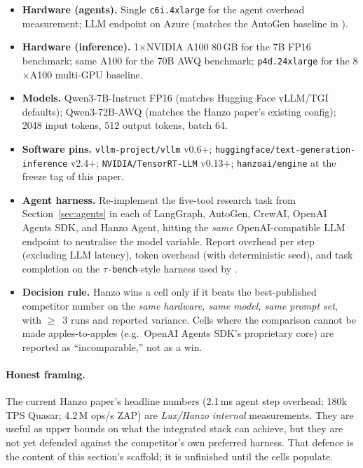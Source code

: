 \begin{itemize}
  \item \textbf{Hardware (agents).} Single \texttt{c6i.4xlarge} for the
        agent overhead measurement; LLM endpoint on Azure (matches the
        AutoGen baseline in \cite{pooya2026frameworks}).
  \item \textbf{Hardware (inference).} 1$\times$NVIDIA A100 80\,GB for
        the 7B FP16 benchmark; same A100 for the 70B AWQ benchmark;
        \texttt{p4d.24xlarge} for the 8$\times$A100 multi-GPU baseline.
  \item \textbf{Models.}
        Qwen3-7B-Instruct FP16 (matches Hugging Face vLLM/TGI defaults);
        Qwen3-72B-AWQ (matches the Hanzo paper's existing config);
        2048 input tokens, 512 output tokens, batch 64.
  \item \textbf{Software pins.}
        \texttt{vllm-project/vllm} v0.6+; \texttt{huggingface/text-generation-inference}
        v2.4+; \texttt{NVIDIA/TensorRT-LLM} v0.13+; \texttt{hanzoai/engine}
        at the freeze tag of this paper.
  \item \textbf{Agent harness.}
        Re-implement the five-tool research task from
        Section~\ref{sec:agents} in each of LangGraph, AutoGen, CrewAI,
        OpenAI Agents SDK, and Hanzo Agent, hitting the \emph{same}
        OpenAI-compatible LLM endpoint to neutralise the model variable.
        Report overhead per step (excluding LLM latency), token overhead
        (with deterministic seed), and task completion on the
        \texttt{$\tau$-bench}-style harness used by
        \cite{pooya2026frameworks}.
  \item \textbf{Decision rule.} Hanzo wins a cell only if it beats the
        best-published competitor number on the \emph{same hardware,
        same model, same prompt set}, with $\geq$~3 runs and reported
        variance. Cells where the comparison cannot be made
        apples-to-apples (e.g.\ OpenAI Agents SDK's proprietary core)
        are reported as ``incomparable,'' not as a win.
\end{itemize}

\paragraph{Honest framing.} The current Hanzo paper's headline numbers
(2.1\,ms agent step overhead; 180k TPS Quasar; 4.2\,M ops/s ZAP) are
\emph{Lux/Hanzo internal} measurements. They are useful as upper bounds
on what the integrated stack can achieve, but they are not yet defended
against the competitor's own preferred harness. That defence is the
content of this section's scaffold; it is unfinished until the cells
populate.

\twocolumn
